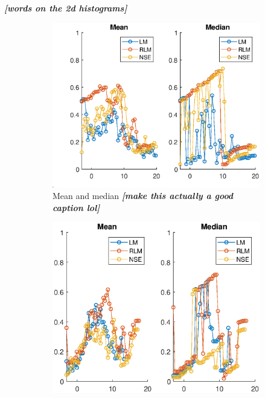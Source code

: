 \par \textbf{\textit{[words on the 2d histograms]}}
\begin{figure}[ht]
\begin{subfigure}{0.50\linewidth}
\centering
\includegraphics[scale=0.6]{figures/flight_results/coop_great_mean_median.eps}
\caption{Mean and median \textit{\textbf{[make this actually a good caption lol]}}}
\label{fig:flightCoopGreatMeanMed}
\end{subfigure}%
\begin{subfigure}{0.50\linewidth}
\centering
\includegraphics[scale=0.6]{figures/flight_results/Coop_good_mean_median.eps}

\end{subfigure}
\end{figure}
